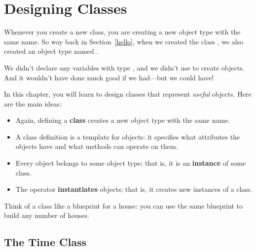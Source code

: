 \chapter{Designing Classes}


Whenever you create a new class, you are creating a new object type with the same name.
So way back in Section~\ref{hello}, when we created the class , we also created an object type named .

We didn't declare any variables with type , and we didn't use  to create  objects.
And it wouldn't have done much good if we had---but we could have!

In this chapter, you will learn to design classes that represent {\em useful} objects.  Here are the main ideas:

\begin{itemize}

\item Again, defining a {\bf class} creates a new object type with the same name.


\item A class definition is a template for objects: it specifies what attributes the objects have and what methods can operate on them.


\item Every object belongs to some object type; that is, it is an {\bf instance} of some class.


\item The  operator {\bf instantiates} objects; that is, it creates new instances of a class.



\end{itemize}

Think of a class like a blueprint for a house: you can use the same blueprint to build any number of houses.

\section{The Time Class}

